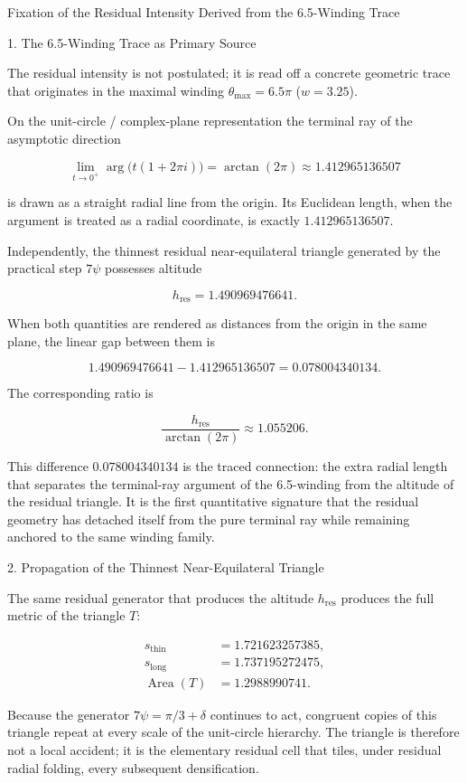 Fixation of the Residual Intensity  
Derived from the 6.5-Winding Trace

1. The 6.5-Winding Trace as Primary Source

The residual intensity is not postulated; it is read off a concrete geometric trace that originates in the maximal winding \(\theta_{\max}=6.5\pi\) (\(w=3.25\)).

On the unit-circle / complex-plane representation the terminal ray of the asymptotic direction

\[
\lim_{t\to 0^+}\arg\bigl(t(1+2\pi i)\bigr)=\arctan(2\pi)\approx 1.412965136507
\]

is drawn as a straight radial line from the origin. Its Euclidean length, when the argument is treated as a radial coordinate, is exactly \(1.412965136507\).

Independently, the thinnest residual near-equilateral triangle generated by the practical step \(7\psi\) possesses altitude

\[
h_{\mathrm{res}}=1.490969476641.
\]

When both quantities are rendered as distances from the origin in the same plane, the linear gap between them is

\[
1.490969476641-1.412965136507=0.078004340134.
\]

The corresponding ratio is

\[
\frac{h_{\mathrm{res}}}{\arctan(2\pi)}\approx 1.055206.
\]

This difference \(0.078004340134\) is the traced connection: the extra radial length that separates the terminal-ray argument of the 6.5-winding from the altitude of the residual triangle. It is the first quantitative signature that the residual geometry has detached itself from the pure terminal ray while remaining anchored to the same winding family.

2. Propagation of the Thinnest Near-Equilateral Triangle

The same residual generator that produces the altitude \(h_{\mathrm{res}}\) produces the full metric of the triangle \(T\):

\[
\begin{align*}
s_{\mathrm{thin}}&=1.721623257385,\\
s_{\mathrm{long}}&=1.737195272475,\\
\operatorname{Area}(T)&=1.2988990741.
\end{align*}
\]

Because the generator \(7\psi=\pi/3+\delta\) continues to act, congruent copies of this triangle repeat at every scale of the unit-circle hierarchy. The triangle is therefore not a local accident; it is the elementary residual cell that tiles, under residual radial folding, every subsequent densification.


